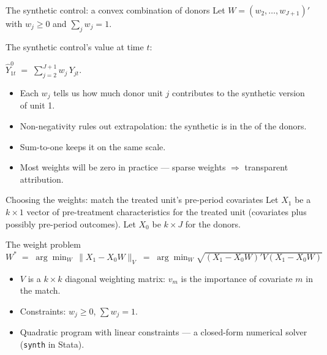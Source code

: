\documentclass[aspectratio=169,11pt]{beamer}
\begin{document}
\begin{frame}{The synthetic control: a convex combination of donors}
\vspace{0.5em}
Let $W = (w_2, \dots, w_{J+1})'$ with $w_j \geq 0$ and $\sum_j w_j = 1$.

\vspace{0.6em}
The synthetic control's value at time $t$:
\vspace{0.2em}
\begin{center}
$\widehat{Y}^0_{1t} \;=\; \displaystyle\sum_{j=2}^{J+1} w_j\, Y_{jt}.$
\end{center}

\vspace{0.7em}
\begin{itemize}\small
  \item Each $w_j$ tells us how much donor unit $j$ contributes to the synthetic version of unit 1.
  \item Non-negativity rules out extrapolation: the synthetic is in the  of the donors.
  \item Sum-to-one keeps it on the same scale.
  \item Most weights will be zero in practice --- sparse weights $\Rightarrow$ transparent attribution.
\end{itemize}
\end{frame}

\begin{frame}{Choosing the weights: match the treated unit's pre-period covariates}
\vspace{0.5em}
Let $X_1$ be a $k \times 1$ vector of pre-treatment characteristics for the treated unit (covariates plus possibly pre-period outcomes). \;Let $X_0$ be $k \times J$ for the donors.

\vspace{0.5em}
\begin{block}{The weight problem}
\centering
$W^{*} \;=\; \displaystyle\arg\min_W \, \|X_1 - X_0 W\|_V \;=\; \arg\min_W \sqrt{(X_1 - X_0 W)' V (X_1 - X_0 W)}$
\end{block}

\vspace{0.5em}
\begin{itemize}\small
  \item $V$ is a $k \times k$ diagonal weighting matrix: $v_m$ is the importance of covariate $m$ in the match.
  \item Constraints: $w_j \geq 0$, $\sum w_j = 1$.
  \item Quadratic program with linear constraints --- a closed-form numerical solver (\texttt{synth} in Stata).
\end{itemize}
\end{frame}
\end{document}
